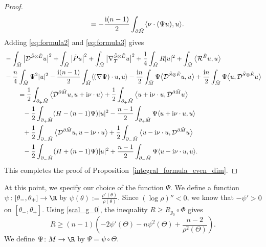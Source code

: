 \begin{proof}
\begin{align}
&\qquad= -\frac{{\rm i}(n-1)}{2} \int_{\partial \tilde{M}} \langle \nu \cdot (\Psi u),u \rangle.\label{eq:formula3}
\end{align}
Adding \eqref{eq:formula2} and \eqref{eq:formula3} gives
\begin{align*}
&- \int_{\tilde{M}} \big|\mathcal{D}^{\tilde{S} \otimes \tilde{E}} u\big|^2 + \int_{\tilde{M}} \big|\tilde{P} u\big|^2 + \int_{\tilde{M}} \big|\nabla_T^{\tilde{S} \otimes \tilde{E}} u\big|^2 + \frac{1}{4} \int_{\tilde{M}} R |u|^2
+ \int_{\tilde{M}} \big\langle \mathcal{R}^{\tilde{E}} u,u \big\rangle \\
&- \frac{n}{4} \int_{\tilde{M}} \Psi^2 |u|^2 - \frac{{\rm i}(n-1)}{2} \int_{\tilde{M}} \langle (\nabla \Psi) \cdot u,u \rangle
- \frac{{\rm i}n}{2} \int_{\tilde{M}} \Psi \big\langle \mathcal{D}^{\tilde{S} \otimes \tilde{E}} u,u \big\rangle + \frac{{\rm i}n}{2} \int_{\tilde{M}} \Psi \big\langle u,\mathcal{D}^{\tilde{S} \otimes \tilde{E}} u \big\rangle\\
&\qquad= \frac{1}{2} \int_{\partial_+ \tilde{M}} \big\langle \mathcal{D}^{\partial \tilde{M}} u,u + {\rm i} \nu \cdot u \big\rangle + \frac{1}{2} \int_{\partial_+ \tilde{M}} \big\langle u + {\rm i} \nu \cdot u,\mathcal{D}^{\partial \tilde{M}} u \big\rangle \\
&\phantom{\qquad=}{} - \frac{1}{2} \int_{\partial_+ \tilde{M}} (H-(n-1)\Psi) |u|^2 - \frac{n-1}{2} \int_{\partial_+ \tilde{M}} \Psi \langle u + {\rm i} \nu \cdot u,u \rangle \\
&\phantom{\qquad=}{} + \frac{1}{2} \int_{\partial_- \tilde{M}} \big\langle \mathcal{D}^{\partial \tilde{M}} u,u - {\rm i} \nu \cdot u \big\rangle + \frac{1}{2} \int_{\partial_- \tilde{M}} \big\langle u - {\rm i} \nu \cdot u,\mathcal{D}^{\partial \tilde{M}} u \big\rangle \\
&\phantom{\qquad=}{} - \frac{1}{2} \int_{\partial_- \tilde{M}} (H+(n-1)\Psi) |u|^2 + \frac{n-1}{2} \int_{\partial_- \tilde{M}} \Psi \langle u - {\rm i} \nu \cdot u,u \rangle.
\end{align*}
This completes the proof of Proposition~\ref{integral_formula_even_dim}.
\end{proof}

At this point, we specify our choice of the function $\Psi$. We define a function $\psi\colon [\theta_-, \theta_+] \to \R$ by $\psi(\theta) := \frac{\rho'(\theta)}{\rho(\theta)}$.
Since $(\log \rho)''<0$, we know that $-\psi' > 0$ on $[\theta_-,\theta_+]$.
Using \eqref{scal_g_0}, the inequality $R \geq R_{g_0} \circ \Phi$ gives
\begin{equation} \label{ineq_for_scal_even_dim}
R \geq (n-1) \left( -2 \psi'(\Theta) - n \psi^2(\Theta) + \frac{n-2}{\rho^2(\Theta)} \right).
\end{equation}
We define $\Psi\colon M \to \R$ by $\Psi = \psi \circ \Theta$.

